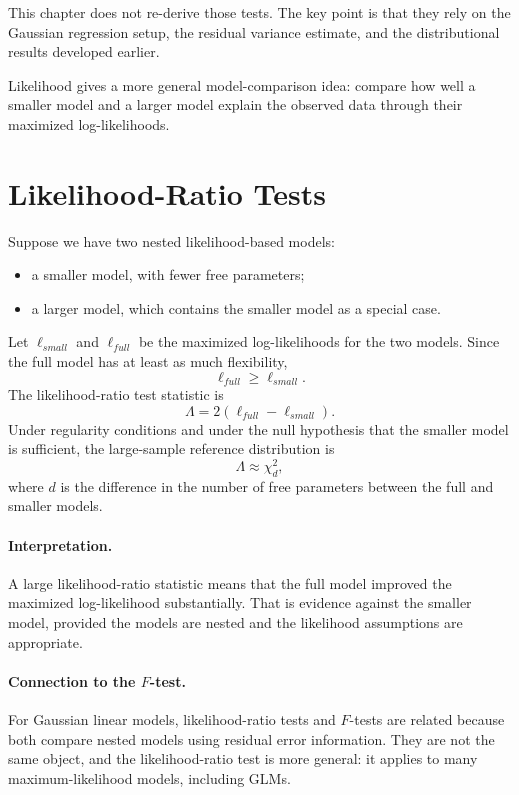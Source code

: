 This chapter does not re-derive those tests.  The key point is that they rely on the Gaussian regression setup, the residual variance estimate, and the distributional results developed earlier.

Likelihood gives a more general model-comparison idea: compare how well a smaller model and a larger model explain the observed data through their maximized log-likelihoods.

\section{Likelihood-Ratio Tests}

Suppose we have two nested likelihood-based models:
\begin{itemize}
  \item a smaller model, with fewer free parameters;
  \item a larger model, which contains the smaller model as a special case.
\end{itemize}
Let \(\ell_{small}\) and \(\ell_{full}\) be the maximized log-likelihoods for the two models.  Since the full model has at least as much flexibility,
\begin{equation}
  \ell_{full}\ge \ell_{small}.
\end{equation}
The likelihood-ratio test statistic is
\begin{equation}
  \boxed{
  \Lambda = 2\left(\ell_{full}-\ell_{small}\right).
  }
  \label{eq:ch14-lrt}
\end{equation}
Under regularity conditions and under the null hypothesis that the smaller model is sufficient, the large-sample reference distribution is
\begin{equation}
  \Lambda \approx \chi^2_{d},
\end{equation}
where \(d\) is the difference in the number of free parameters between the full and smaller models.

\paragraph{Interpretation.}
A large likelihood-ratio statistic means that the full model improved the maximized log-likelihood substantially.  That is evidence against the smaller model, provided the models are nested and the likelihood assumptions are appropriate.

\paragraph{Connection to the \(F\)-test.}
For Gaussian linear models, likelihood-ratio tests and \(F\)-tests are related because both compare nested models using residual error information.  They are not the same object, and the likelihood-ratio test is more general: it applies to many maximum-likelihood models, including GLMs.

